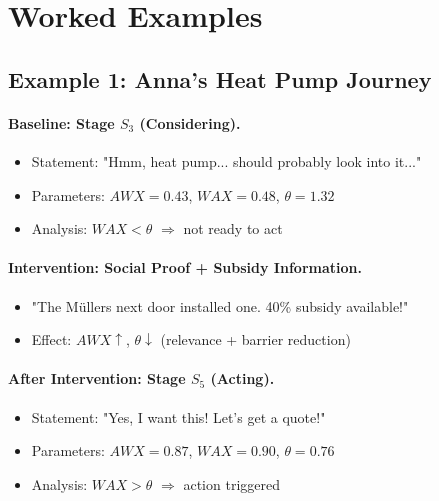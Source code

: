 
\section{Worked Examples}
\label{sec:bcj-applications}


\subsection{Example 1: Anna's Heat Pump Journey}

\paragraph{Baseline: Stage $S_3$ (Considering).}
\begin{itemize}
    \item Statement: "Hmm, heat pump... should probably look into it..."
    \item Parameters: $AWX = 0.43$, $WAX = 0.48$, $\theta = 1.32$
    \item Analysis: $WAX < \theta$ $\Rightarrow$ not ready to act
\end{itemize}

\paragraph{Intervention: Social Proof + Subsidy Information.}
\begin{itemize}
    \item "The Müllers next door installed one. 40\% subsidy available!"
    \item Effect: $AWX \uparrow$, $\theta \downarrow$ (relevance + barrier reduction)
\end{itemize}

\paragraph{After Intervention: Stage $S_5$ (Acting).}
\begin{itemize}
    \item Statement: "Yes, I want this! Let's get a quote!"
    \item Parameters: $AWX = 0.87$, $WAX = 0.90$, $\theta = 0.76$
    \item Analysis: $WAX > \theta$ $\Rightarrow$ action triggered
\end{itemize}

